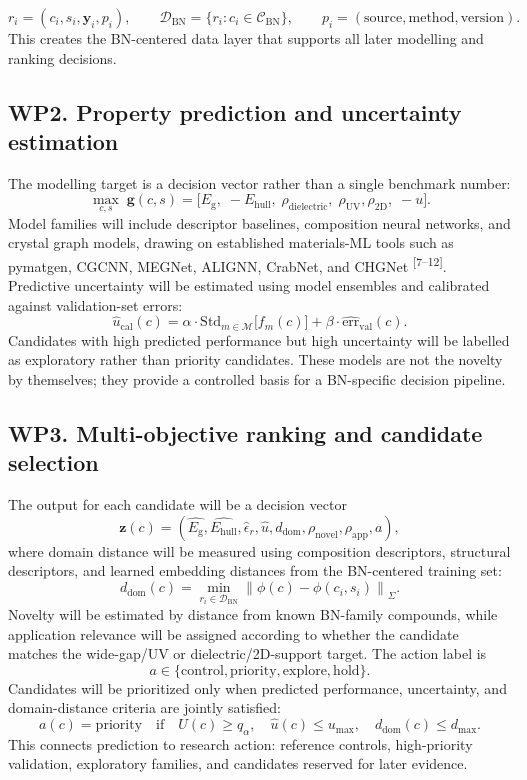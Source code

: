\documentclass[10pt]{article}
\newcommand{\eg}{E_{\mathrm{g}}}
\newcommand{\ehull}{E_{\mathrm{hull}}}
\newcommand{\unc}{u}
\newcommand{\domain}{d_{\mathrm{dom}}}
\newcommand{\utility}{U}
\begin{document}
\[
  r_i=(c_i,s_i,\mathbf{y}_i,p_i),\qquad
  \mathcal{D}_{\mathrm{BN}}=\{r_i:c_i\in\mathcal{C}_{\mathrm{BN}}\},\qquad
  p_i=(\mathrm{source},\mathrm{method},\mathrm{version}).
\]
This creates the BN-centered data layer that supports all later modelling and ranking decisions.

\subsection*{WP2. Property prediction and uncertainty estimation}
The modelling target is a decision vector rather than a single benchmark number:
\[
  \max_{c,s}\; \mathbf{g}(c,s)=
  \big[\eg,\;-\ehull,\;\rho_{\mathrm{dielectric}},\;\rho_{\mathrm{UV}},
  \rho_{\mathrm{2D}},\;-\unc\big].
\]
Model families will include descriptor baselines, composition neural networks, and crystal graph models, drawing on established materials-ML tools such as pymatgen, CGCNN, MEGNet, ALIGNN, CrabNet, and CHGNet \textsuperscript{[7--12]}. Predictive uncertainty will be estimated using model ensembles and calibrated against validation-set errors:
\[
  \hat{\unc}_{\mathrm{cal}}(c)=
  \alpha\cdot \mathrm{Std}_{m\in\mathcal{M}}\big[f_m(c)\big]+
  \beta\cdot \widehat{\mathrm{err}}_{\mathrm{val}}(c).
\]
Candidates with high predicted performance but high uncertainty will be labelled as exploratory rather than priority candidates. These models are not the novelty by themselves; they provide a controlled basis for a BN-specific decision pipeline.

\subsection*{WP3. Multi-objective ranking and candidate selection}
The output for each candidate will be a decision vector
\[
  \mathbf{z}(c)=
  (\hat{\eg},\hat{\ehull},\hat{\epsilon}_r,\hat{\unc},\domain,
  \rho_{\mathrm{novel}},\rho_{\mathrm{app}},a),
\]
where domain distance will be measured using composition descriptors, structural descriptors, and learned embedding distances from the BN-centered training set:
\[
  \domain(c)=\min_{r_i\in\mathcal{D}_{\mathrm{BN}}}
  \left\|\phi(c)-\phi(c_i,s_i)\right\|_{\Sigma}.
\]
Novelty will be estimated by distance from known BN-family compounds, while application relevance will be assigned according to whether the candidate matches the wide-gap/UV or dielectric/2D-support target. The action label is
\[
  a\in\{\mathrm{control},\mathrm{priority},\mathrm{explore},\mathrm{hold}\}.
\]
Candidates will be prioritized only when predicted performance, uncertainty, and domain-distance criteria are jointly satisfied:
\[
  a(c)=\mathrm{priority}\quad\mathrm{if}\quad
  \utility(c)\ge q_{\alpha},\quad \hat{\unc}(c)\le u_{\max},\quad
  \domain(c)\le d_{\max}.
\]
This connects prediction to research action: reference controls, high-priority validation, exploratory families, and candidates reserved for later evidence.
\end{document}
